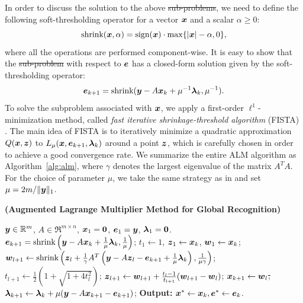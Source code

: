 \documentclass[12pt,journal,draftcls,letterpaper,onecolumn]{IEEEtran}
\providecommand{\DIFadd}[1]{{\protect\color{blue}\uwave{#1}}} %
\providecommand{\DIFdel}[1]{{\protect\color{red}\sout{#1}}}                      %
\providecommand{\DIFaddbegin}{} %
\providecommand{\DIFaddend}{} %
\providecommand{\DIFdelbegin}{} %
\providecommand{\DIFdelend}{} %
\begin{document}
\DIFaddend In order to discuss the solution to the above \DIFdelbegin \DIFdel{sub-problems}\DIFdelend \DIFaddbegin \DIFadd{subproblems}\DIFaddend , we
need to define the following soft-thresholding operator for a
vector ${\boldsymbol{x}}$ and a scalar $\alpha \geq 0$:
\begin{equation}
\textup{shrink}({\boldsymbol{x}},\alpha) = \textup{sign}({\boldsymbol{x}})\cdot \max \{|{\boldsymbol{x}}| - \alpha, 0\},
\end{equation}
where all the operations are performed component-wise. It is
easy to show that the \DIFdelbegin \DIFdel{sub-problem }\DIFdelend \DIFaddbegin \DIFadd{subproblem }\DIFaddend with respect to $\boldsymbol{e}$ has a
closed-form solution given by the soft-thresholding operator:
\begin{equation}
\boldsymbol{e}_{k+1} = \textup{shrink}({\boldsymbol{y}} - A{\boldsymbol{x}}_k + \mu^{-1}\boldsymbol{\lambda}_k, \mu^{-1}).
\end{equation}
To solve the subproblem associated with ${\boldsymbol{x}}$, we
apply a first-order $\ell^1$-minimization method,
called \emph{fast iterative shrinkage-threshold algorithm}
(FISTA) \cite{BeckA2009}. The main idea of FISTA is to
iteratively minimize a quadratic approximation $Q({\boldsymbol{x}}, \boldsymbol{z})$ to
$L_{\mu} ({\boldsymbol{x}},\boldsymbol{e}_{k+1},\boldsymbol{\lambda}_k)$ around a point $\boldsymbol{z}$, which is
carefully chosen in order to achieve a good convergence
rate. We summarize the entire ALM
algorithm as Algorithm~\ref{alg:alm}, where $\gamma$ denotes the
largest eigenvalue of the matrix $A^TA$. For the choice of parameter $\mu$, we take the same strategy as
in \cite{YangJ2009-pp} and set $\mu = 2m / \|{\boldsymbol{y}}\|_1$.
\DIFdelbegin %
\DIFdelend \DIFaddbegin \begin{algorithm}[t]
\DIFaddend \caption{\bf (Augmented Lagrange Multiplier Method for Global
Recognition)}
\begin{algorithmic}[1]
\DIFaddbegin \begin{small}
\DIFaddend {} ${\boldsymbol{y}} \in \mathbb R^m$, $A \in \Re^{m \times n}$,
${\boldsymbol{x}}_1 = \boldsymbol{0}$, $\boldsymbol{e}_1 = {\boldsymbol{y}}$, $\boldsymbol{\lambda}_1 =
\boldsymbol{0}$.
\STATE $\boldsymbol{e}_{k+1} = \textup{shrink}\left({\boldsymbol{y}} - A{\boldsymbol{x}}_k +
\frac{1}{\mu}\boldsymbol{\lambda}_k, \frac{1}{\mu}\right)$;
\STATE $t_1\leftarrow 1$, $\boldsymbol{z}_1 \leftarrow {\boldsymbol{x}}_k$, $\boldsymbol{w}_1 \leftarrow {\boldsymbol{x}}_k$;
\STATE $\boldsymbol{w}_{l+1} \leftarrow \textup{shrink}\left(\boldsymbol{z}_l +
\frac{1}{\gamma}A^T\left({\boldsymbol{y}} - A\boldsymbol{z}_l - \boldsymbol{e}_{k+1} +
\frac{1}{\mu}\boldsymbol{\lambda}_k\right), \frac{1}{\mu\gamma}\right)$;
\STATE $t_{l+1} \leftarrow \frac{1}{2}\left( 1 +
\sqrt{1+4t_l^2}\right)$;
\STATE $\boldsymbol{z}_{l+1} \leftarrow \boldsymbol{w}_{l+1} + \frac{t_l - 1}{t_{l+1}}(\boldsymbol{w}_{l+1} - \boldsymbol{w}_l)$;
\ENDWHILE
\STATE ${\boldsymbol{x}}_{k+1} \leftarrow \boldsymbol{w}_{l}$\DIFdelbegin \DIFdel{;
}%
\DIFdelend \DIFaddbegin \DIFadd{,  }\; \DIFaddend $\boldsymbol{\lambda}_{k+1} \leftarrow \boldsymbol{\lambda}_k + \mu ({\boldsymbol{y}} - A{\boldsymbol{x}}_{k+1} - \boldsymbol{e}_{k+1})$;
\ENDWHILE \STATE
{\bf Output:} ${\boldsymbol{x}}^* \leftarrow {\boldsymbol{x}}_k, \boldsymbol{e}^* \leftarrow \boldsymbol{e}_k$.
\DIFaddbegin \end{small}
\DIFaddend \end{algorithmic}
\label{alg:alm} 
\end{algorithm}
\end{document}
